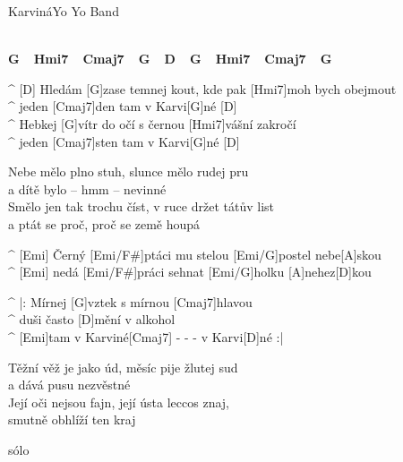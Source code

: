 \begin{song}{Karviná}{Yo Yo Band}

\\
\textbf{G\ \ Hmi7\ \ Cmaj7\ \ G\ \ D\ \ G\ \ Hmi7\ \ Cmaj7\ \ G}

\begin{guitar}
^ [D] Hledám [G]zase temnej kout, kde pak [Hmi7]moh bych obejmout\\
^ jeden [Cmaj7]den tam v Karvi[G]né [D]\\
^ Hebkej [G]vítr do očí s černou [Hmi7]vášní zakročí\\
^ jeden [Cmaj7]sten tam v Karvi[G]né [D]\\
\end{guitar}

\begin{guitar}
Nebe mělo plno stuh, slunce mělo rudej pru\\
a dítě bylo – hmm – nevinné\\
Smělo jen tak trochu číst, v ruce držet tátův list\\
a ptát se proč, proč se země houpá\\
\end{guitar}

\begin{guitar}
^ [Emi]   Černý [Emi/F#]ptáci mu stelou [Emi/G]postel nebe[A]skou\\
^ [Emi]   nedá [Emi/F#]práci sehnat [Emi/G]holku [A]nehez[D]kou\\
\end{guitar}

\begin{guitar}
^ |: Mírnej [G]vztek s mírnou [Cmaj7]hlavou\\
^ duši často [D]mění v alkohol\\
^ [Emi]tam v Karviné[Cmaj7] - - - v Karvi[D]né :|\\
\end{guitar}

\begin{guitar}
Těžní věž je jako úd, měsíc pije žlutej sud\\
a dává pusu nezvěstné\\
Její oči nejsou fajn, její ústa leccos znaj,\\
smutně obhlíží ten kraj\\
\end{guitar}


\begin{guitar}
sólo\\
\end{guitar}



\end{song}
